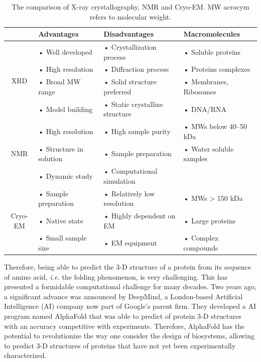 \begin{table}[h!]
	\begin{tabular}{cp{4cm}p{5cm}p{4.5cm}}
		\hline
		& Advantages & Disadvantages & Macromolecules\\
		\hline
		\multirow{4}{*}{XRD} & • Well developed & • Crystallization process & • Soluble proteins \\
		& • High resolution & • Diffraction process
		& • Proteins complexes \\
		& • Broad MW range & • Solid structure preferred & • Membranes, Ribosomes \\
		& • Model building &• Static crystalline structure & • DNA/RNA \\
		\hline
		\multirow{3}{*}{NMR} & • High resolution & • High sample purity & • MWs below 40–50 kDa \\
		& • Structure in solution & • Sample preparation & • Water soluble samples\\
		& • Dynamic study	& • Computational simulation & \\
		\hline
		\multirow{3}{*}{Cryo-EM} & • Sample preparation & • Relatively low resolution
		& • MWs > 150 kDa\\
		& • Native state & • Highly dependent on EM & • Large proteins\\
		& • Small sample size	& • EM equipment & • Complex compounds \\
		\hline
	\end{tabular}
	\caption{The comparison of X-ray crystallography, NMR and Cryo-EM. MW acrocym refers to molecular weight.}
	\label{TAB1}
\end{table}

Therefore, being able to predict the 3-D structure of a protein from its sequence of amino acid, \textit{i.e.} the folding phenomenon, is very challenging. This has presented a formidable computational challenge for many decades. Two years ago, a significant advance was announced by DeepMind, a London-based Artificial Intelligence (AI) company now part of Google’s parent firm. They developed a AI program named AlphaFold\cite{AlphaFold} that was able to predict of protein 3-D structures with an accuracy competitive with experiments. Therefore, AlphaFold has the potential to revolutionize the way one consider the design of biosystems, allowing to predict 3-D structures of proteins that have not yet been experimentally characterized.

